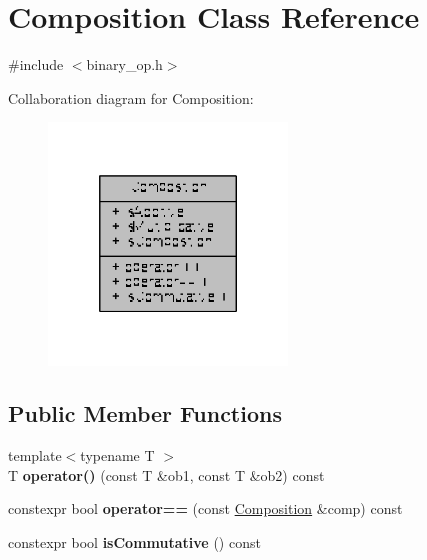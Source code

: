 \hypertarget{classComposition}{\section{Composition Class Reference}
\label{classComposition}
}


{\ttfamily \#include $<$binary\-\_\-op.\-h$>$}



Collaboration diagram for Composition\-:
\nopagebreak
\begin{figure}[H]
\begin{center}
\leavevmode
\includegraphics[width=180pt]{classComposition__coll__graph}
\end{center}
\end{figure}
\subsection*{Public Member Functions}
\begin{DoxyCompactItemize}
\item 
\hypertarget{classComposition_a048fe922128d64e0ac28f59ee3dd6206}{{\footnotesize template$<$typename T $>$ }\\T {\bfseries operator()} (const T \&ob1, const T \&ob2) const }\label{classComposition_a048fe922128d64e0ac28f59ee3dd6206}

\item 
\hypertarget{classComposition_aa7138528e28388909e59890feda24330}{constexpr bool {\bfseries operator==} (const \hyperlink{classComposition}{Composition} \&comp) const }\label{classComposition_aa7138528e28388909e59890feda24330}

\item 
\hypertarget{classComposition_a4aab02a31e428b6ad1814aeec6235b09}{constexpr bool {\bfseries is\-Commutative} () const }\label{classComposition_a4aab02a31e428b6ad1814aeec6235b09}

\end{DoxyCompactItemize}
